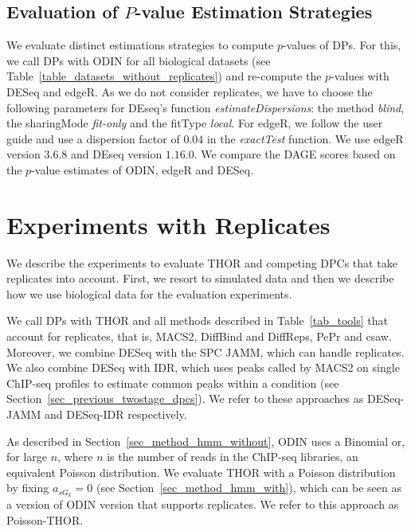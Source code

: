 \subsection{Evaluation of $P$-value Estimation Strategies}
We evaluate distinct estimations strategies to compute $p$-values of DPs.
For this, we call DPs with ODIN for all biological datasets (see Table~\ref{table_datasets_without_replicates}) and re-compute the $p$-values with DESeq and edgeR.
As we do not consider replicates, we have to choose the following parameters for DEseq's function \textit{estimateDispersions}: 
the method \textit{blind}, the sharingMode \textit{fit-only} and the fitType \textit{local}.
For edgeR, we follow the user guide and use a dispersion factor of $0.04$ in the \textit{exactTest} function.
We use edgeR version $3.6.8$ and DEseq version $1.16.0$.
We compare the DAGE scores based on the $p$-value estimates of ODIN, edgeR and DESeq.


\section{Experiments with Replicates}
We describe the experiments to evaluate THOR and competing DPCs that take replicates into account. 
First, we resort to simulated data and then we describe how we use biological data for the evaluation experiments.

We call DPs with THOR and all methods described in Table~\ref{tab_tools} that account for replicates, that is, MACS2, DiffBind and DiffReps, PePr and csaw.
Moreover, we combine DESeq with the SPC JAMM, which can handle replicates. 
We also combine DESeq with IDR, which uses peaks called by MACS2 on single ChIP-seq profiles to estimate common peaks within a condition (see Section~\ref{sec_previous_twostage_dpcs}).
We refer to these approaches as DESeq-JAMM and DESeq-IDR respectively.

As described in Section~\ref{sec_method_hmm_without}, ODIN uses a Binomial or, for large $n$, where $n$ is the number of reads in the ChIP-seq libraries, an equivalent Poisson distribution.
We evaluate THOR with a Poisson distribution by fixing $a_{sG_k}=0$ (see Section~\ref{sec_method_hmm_with}), which can be seen as a version of ODIN version that supports replicates.
We refer to this approach as Poisson-THOR.

